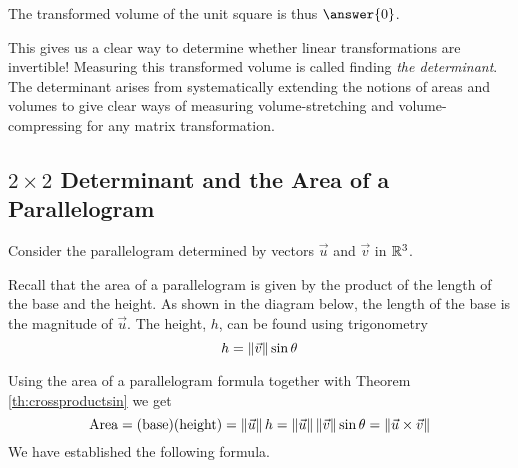 \documentclass{ximera}
\begin{document}
The transformed volume of the unit square is thus $\answer{0}$.

This gives us a clear way to determine whether linear transformations are invertible! Measuring this transformed volume is called finding \emph{the determinant}. The determinant arises from systematically extending the notions of areas and volumes to give clear ways of measuring volume-stretching and volume-compressing for any matrix transformation.


    \subsection*{$2\times 2$ Determinant and the Area of a Parallelogram}
     
    Consider the parallelogram determined by vectors $\vec{u}$ and $\vec{v}$ in $\mathbb{R}^3$.
     
    \begin{center}
    \end{center}
     
    Recall that the area of a parallelogram is given by the product of the length of the base and the height.
    As shown in the diagram below, the length of the base is the magnitude of $\vec{u}$. The height, $h$, can be found using trigonometry $$h=\left\|\vec{v}\right\|\sin\theta$$
    \begin{center}
    \end{center}
    Using the area of a parallelogram formula together with Theorem \ref{th:crossproductsin} we get
    $$\mbox{Area}=(\text{base})(\text{height})=\left\|\vec{u}\right\|h=\left\|\vec{u}\right\|\left\|\vec{v}\right\|\sin\theta=\left\|\vec{u}\times\vec{v}\right\|$$
    We have established the following formula.
     
\end{document}

